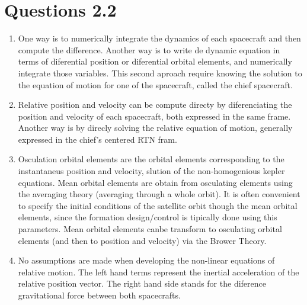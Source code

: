 \documentclass[a4paper]{article}
\begin{document}
\section{Questions 2.2}
\begin{enumerate}[label=\emph{\alph*)}]
  \item %
    One way is to numerically integrate the dynamics of each spacecraft and then compute the difference. Another way is to write de dynamic equation in terms of diferential position or diferential orbital elements, and numerically integrate those variables. This second aproach require knowing the solution to the equation of motion for one of the spacecraft, called the chief spacecraft.

  \item %
    Relative position and velocity can be compute directy by diferenciating the position and velocity of each spacecraft, both expressed in the same frame. Another way is by direcly solving the relative equation of motion, generally expressed in the chief's centered RTN fram.
  \item %
    Osculation orbital elements are the orbital elements corresponding to the instantaneus position and velocity, slution of the non-homogenious kepler equations. Mean orbital elements are obtain from osculating elements using the averaging theory (averaging through a whole orbit). It is often convenient to specify the initial conditions of the satellite orbit though the mean orbital elements, since the formation design/control is tipically done using this parameters. Mean orbital elements canbe transform to osculating orbital elements (and then to position and velocity) via the Brower Theory.

  \item %
    No assumptions are made when developing the non-linear equations of relative motion. The left hand terms represent the inertial acceleration of the relative position vector. The right hand side stands for the diference gravitational force between both spacecrafts.


\end{enumerate}
\end{document}
